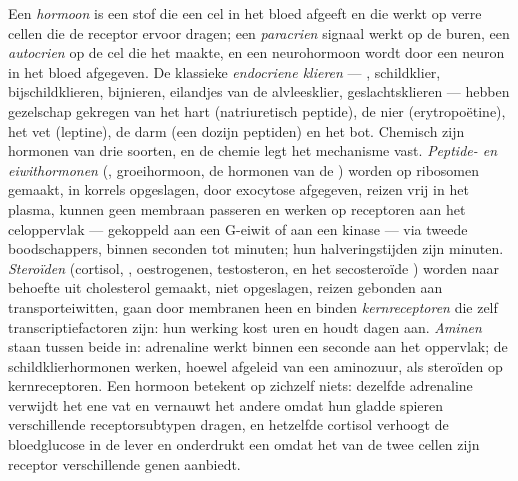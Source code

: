 \begin{definition}[Hormoon]\label{def:b3:endocrinology:hormone}
Een \emph{hormoon} is een stof die een cel in het bloed afgeeft en die
werkt op verre cellen die de receptor ervoor dragen; een
\emph{paracrien} signaal werkt op de buren, een \emph{autocrien} op de
cel die het maakte, en een neurohormoon wordt door een neuron in het
bloed afgegeven. De klassieke \emph{endocriene klieren} --- ,
schildklier, bijschildklieren, bijnieren, eilandjes van de
alvleesklier, geslachtsklieren --- hebben gezelschap gekregen van het
hart (natriuretisch peptide), de nier (erytropoëtine), het vet
(leptine), de darm (een dozijn peptiden) en het bot. Chemisch zijn
hormonen van drie soorten, en de chemie legt het mechanisme vast.
\emph{Peptide- en eiwithormonen} (, groeihormoon, de hormonen
van de ) worden op ribosomen gemaakt, in korrels opgeslagen,
door exocytose afgegeven, reizen vrij in het plasma, kunnen geen
membraan passeren en werken op receptoren aan het celoppervlak ---
gekoppeld aan een G-eiwit of aan een kinase --- via tweede
boodschappers, binnen seconden tot minuten; hun halveringstijden zijn
minuten. \emph{Steroïden} (cortisol, , oestrogenen,
testosteron, en het secosteroïde ) worden naar behoefte uit
cholesterol gemaakt, niet opgeslagen, reizen gebonden aan
transporteiwitten, gaan door membranen heen en binden
\emph{kernreceptoren} die zelf transcriptiefactoren zijn: hun werking
kost uren en houdt dagen aan. \emph{Aminen} staan tussen beide in:
adrenaline werkt binnen een seconde aan het oppervlak; de
schildklierhormonen werken, hoewel afgeleid van een aminozuur, als
steroïden op kernreceptoren. Een hormoon betekent op zichzelf niets:
dezelfde adrenaline verwijdt het ene vat en vernauwt het andere omdat
hun gladde spieren verschillende receptorsubtypen dragen, en hetzelfde
cortisol verhoogt de bloedglucose in de lever en onderdrukt een
 omdat het  van de twee cellen zijn receptor
verschillende genen aanbiedt.
\end{definition}

